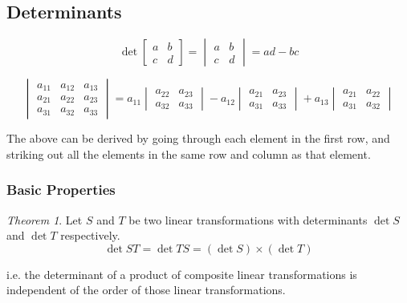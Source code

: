 \documentclass[a4paper]{article}
\theoremstyle{remark}
\theoremstyle{theorem}
\newtheorem{theorem}{Theorem}
\begin{document}
\subsection{Determinants}
\begin{equation}
	\det 
	\begin{bmatrix}
		a	& b \\
		c	& d
	\end{bmatrix}
	=
	\begin{vmatrix}
		a & b \\
		c & d
	\end{vmatrix}
	= ad - bc
\end{equation}

\begin{equation}
	\begin{vmatrix}
	a_{11} & a_{12} & a_{13} \\
	a_{21} & a_{22} & a_{23} \\
	a_{31} & a_{32} & a_{33} 
	\end{vmatrix}
	=
	a_{11}
	\begin{vmatrix}
	a_{22} & a_{23} \\
	a_{32} & a_{33}
	\end{vmatrix}
	-a_{12}
	\begin{vmatrix}
	a_{21} & a_{23} \\
	a_{31} & a_{33}
	\end{vmatrix}
	+a_{13}
	\begin{vmatrix}
	a_{21} & a_{22} \\
	a_{31} & a_{32}
	\end{vmatrix}
\end{equation}

The above can be derived by going through each element in the first row, and striking out all the elements in the same row and column as that element.

\subsubsection{Basic Properties}
\begin{theorem}
	Let $S$ and $T$ be two linear transformations with determinants $\det{S}$ and $\det{T}$ respectively.
	\begin{equation}
		\det{ST} = \det{TS} = (\det{S}) \times (\det{T})
	\end{equation}

	i.e. the determinant of a product of composite linear transformations is independent of the order of those linear transformations.
\end{theorem}
\end{document}
